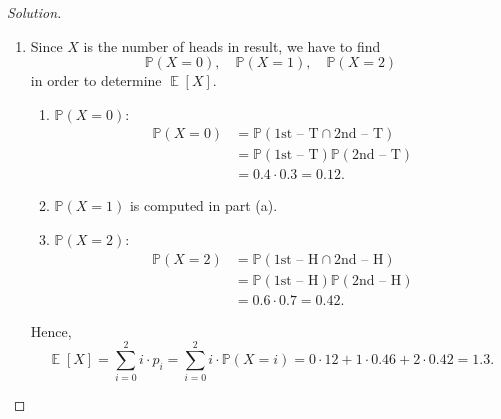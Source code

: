 \documentclass{article}[12pt]
\newenvironment{solution}
  {\renewcommand\qedsymbol{$\blacksquare$}\begin{proof}[Solution]}
  {\end{proof}}
\DeclareMathOperator{\E}{\mathbb{E}}
\renewcommand{\P}{\mathbb{P}}
\begin{document}
\begin{solution}
\begin{enumerate}[label=(\alph*)]
    \item Since $X$ is the number of heads in result, we have to find
    \begin{equation*}
        \P(X = 0),\quad\P(X = 1),\quad\P(X = 2)
    \end{equation*}
    in order to determine $\E[X]$.
    \begin{enumerate}[label=(b.\arabic*)]
        \item $\P(X = 0)$:
        \begin{align*}
            \P(X = 0) &= \P(\text{1st -- T}\cap\text{2nd -- T})
            \\
            &=\P(\text{1st -- T})\P(\text{2nd -- T})
            \\
            &=0.4\cdot 0.3 = 0.12.
        \end{align*}
        \item $\P(X = 1)$ is computed in part (a).
        \item $\P(X = 2)$:
        \begin{align*}
            \P(X = 2) &= \P(\text{1st -- H}\cap\text{2nd -- H})
            \\
            &=\P(\text{1st -- H})\P(\text{2nd -- H})
            \\
            &=0.6\cdot 0.7 = 0.42.
        \end{align*}
    \end{enumerate}
    Hence,
    \begin{equation*}
        \E[X] = \sum_{i=0}^{2}i\cdot p_{i} = \sum_{i=0}^{2}i\cdot\P(X=i) = 0\cdot 12 + 1\cdot 0.46 + 2\cdot 0.42 = 1.3.
    \end{equation*}
\end{enumerate}
\end{solution}
\end{document}
